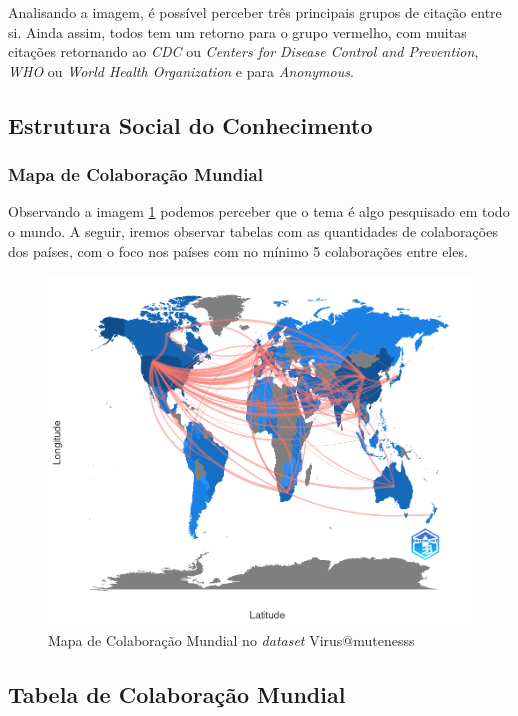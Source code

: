 Analisando a imagem, é possível perceber três principais grupos de citação entre si. Ainda assim, todos tem um retorno para o grupo vermelho, com muitas citações retornando ao \textit{CDC} ou \textit{Centers for Disease Control and Prevention}, \textit{WHO} ou \textit{World Health Organization} e para \textit{Anonymous}.


\subsection{Estrutura Social  do Conhecimento}

\subsubsection{Mapa de Colaboração Mundial}

Observando a imagem \ref{fig:Comap:Virus@mutenesss} podemos perceber que o tema é algo pesquisado em todo o mundo. A seguir, iremos observar tabelas com as quantidades de colaborações dos países, com o foco nos países com no mínimo 5 colaborações entre eles.

\begin{figure}[h]
      \centering
      \includegraphics[width=1\textwidth]{exploratory-data-analysis/mutenesss/Virus/20221128/img/worldcolab.png}
      \caption{Mapa de Colaboração Mundial no \textit{dataset} Virus@mutenesss}
      \label{fig:Comap:Virus@mutenesss}
  \end{figure}
\subsection{Tabela de Colaboração Mundial}

